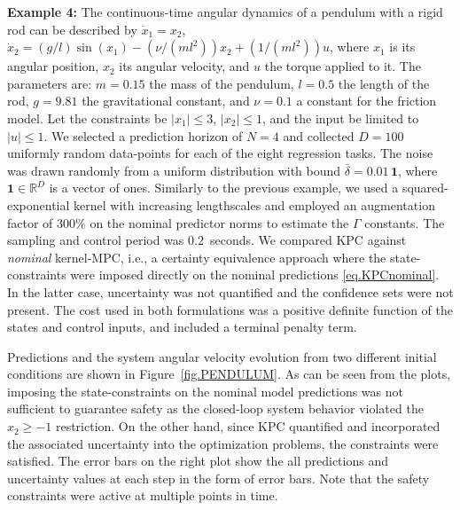 \textbf{Example 4:} The continuous-time angular dynamics of a pendulum with a rigid rod can be described by $\dot x_1 = x_2$, $\dot x_2 = (g/l)\sin(x_1) - (\nu/(ml^2)) x_2 + (1/(m l^2)) u$, where $x_1$ is its angular position, $x_2$ its angular velocity, and $u$ the torque applied to it. The parameters are: $m = 0.15$ the mass of the pendulum, $l = 0.5$ the length of the rod, $g = 9.81$ the gravitational constant, and $\nu = 0.1$ a constant for the friction model. Let the constraints be $\vert x_1 \vert \leq 3$, $\vert x_2 \vert \leq 1$, and the input be limited to $\vert u \vert \leq 1$. We selected a prediction horizon of $N=4$ and collected $D=100$ uniformly random data-points for each of the eight regression tasks. The noise was drawn randomly from a uniform distribution with bound $\bar \delta = 0.01 \, \textbf{1}$, where $\textbf{1} \in \mathbb{R}^D$ is a vector of ones. Similarly to the previous example, we used a squared-exponential kernel with increasing lengthscales and employed an augmentation factor of $300\%$ on the nominal predictor norms to estimate the $\Gamma$ constants. The sampling and control period was $0.2$~seconds. We compared KPC against \textit{nominal} kernel-MPC, i.e., a certainty equivalence approach where the state-constraints were imposed directly on the nominal predictions \eqref{eq.KPCnominal}. In the latter case, uncertainty was not quantified and the confidence sets were not present. The cost used in both formulations was a positive definite function of the states and control inputs, and included a terminal penalty term. 

Predictions and the system angular velocity evolution from two different initial conditions are shown in Figure~\ref{fig.PENDULUM}. As can be seen from the plots, imposing the state-constraints on the nominal model predictions was not sufficient to guarantee safety as the closed-loop system behavior violated the $x_2 \geq -1$ restriction. On the other hand, since KPC quantified and incorporated the associated uncertainty into the optimization problems, the constraints were satisfied. The error bars on the right plot show the all predictions and uncertainty values at each step in the form of error bars. Note that the safety constraints were active at multiple points in time. 

